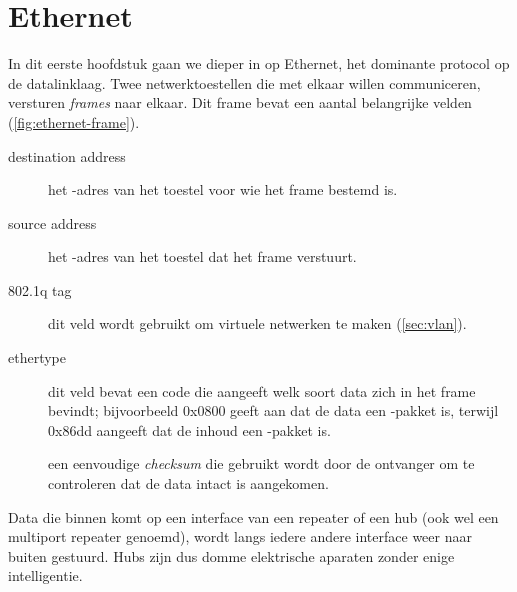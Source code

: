 \chapter{Ethernet}
\label{chap:ethernet}

In dit eerste hoofdstuk gaan we dieper in op Ethernet, het dominante protocol op de datalinklaag.
Twee netwerktoestellen die met elkaar willen communiceren, versturen \emph{frames} naar elkaar.
Dit frame bevat een aantal belangrijke velden (\cref{fig:ethernet-frame}).
\begin{description}
    \item[destination address]
    het -adres van het toestel voor wie het frame bestemd is.
    
    \item[source address]
    het -adres van het toestel dat het frame verstuurt.
    
    \item[802.1q tag]
    dit veld wordt gebruikt om virtuele netwerken te maken (\vref{sec:vlan}).
    
    \item[ethertype]
    dit veld bevat een code die aangeeft welk soort data zich in het frame bevindt; bijvoorbeeld 0x0800 geeft aan dat de data een -pakket is, terwijl 0x86dd aangeeft dat de inhoud een -pakket is.
    
    \item[]
    een eenvoudige \emph{checksum} die gebruikt wordt door de ontvanger om te controleren dat de data intact is aangekomen.
\end{description}

Data die binnen komt op een interface van een repeater of een hub (ook wel een multiport repeater genoemd), wordt langs iedere andere interface weer naar buiten gestuurd.
Hubs zijn dus domme elektrische aparaten zonder enige intelligentie.

